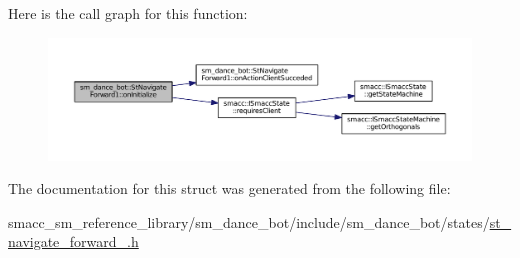 Here is the call graph for this function\+:
\nopagebreak
\begin{figure}[H]
\begin{center}
\leavevmode
\includegraphics[width=350pt]{structsm__dance__bot_1_1StNavigateForward1_aca9caa8bd74d17b2d735db4cfb3cfe4c_cgraph}
\end{center}
\end{figure}




The documentation for this struct was generated from the following file\+:\begin{DoxyCompactItemize}
\item 
smacc\+\_\+sm\+\_\+reference\+\_\+library/sm\+\_\+dance\+\_\+bot/include/sm\+\_\+dance\+\_\+bot/states/\hyperlink{st__navigate__forward__1_8h}{st\+\_\+navigate\+\_\+forward\+\_.\+h}\end{DoxyCompactItemize}
